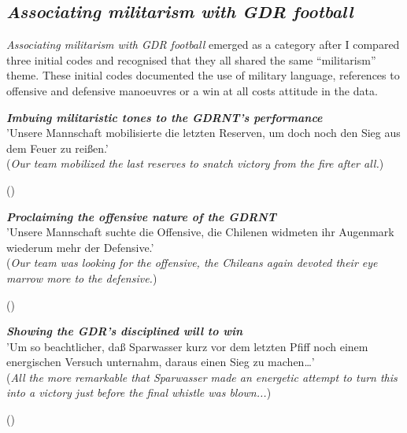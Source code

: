 \subsection*{\textit{Associating militarism with GDR football}}

\textit{Associating militarism with GDR football} emerged as a category after I compared three initial codes and recognised that they all shared the same “militarism” theme. These initial codes documented the use of military language, references to offensive and defensive manoeuvres or a win at all costs attitude in the data.

\begin{displayquote}
\begin{small}
\textbf{\textit{Imbuing militaristic tones to the GDRNT’s performance}}\\
'Unsere Mannschaft mobilisierte die letzten Reserven, um doch noch den Sieg aus dem Feuer zu reißen.'\\
(\textit{Our team mobilized the last reserves to snatch victory from the fire after all.})\
\begin{flushright}\footnotesize (\cite{nd19740619})\end{flushright}
\end{small}
\end{displayquote}

\begin{displayquote}
\begin{small}
\textbf{\textit{Proclaiming the offensive nature of the GDRNT}}\\
'Unsere Mannschaft suchte die Offensive, die Chilenen widmeten ihr Augenmark wiederum mehr der Defensive.'\\
(\textit{Our team was looking for the offensive, the Chileans again devoted their eye marrow more to the defensive.})\
\begin{flushright}\footnotesize (\cite{nd19740619})\end{flushright}
\end{small}
\end{displayquote}

\begin{displayquote}
\begin{small}
\textbf{\textit{Showing the GDR’s disciplined will to win}}\\
'Um so beachtlicher, daß Sparwasser kurz vor dem letzten Pfiff noch einem energischen Versuch unternahm, daraus einen Sieg zu machen…'\\
(\textit{All the more remarkable that Sparwasser made an energetic attempt to turn this into a victory just before the final whistle was blown...})\
\begin{flushright}\footnotesize (\cite{nd19740530})\end{flushright}
\end{small}
\end{displayquote}

